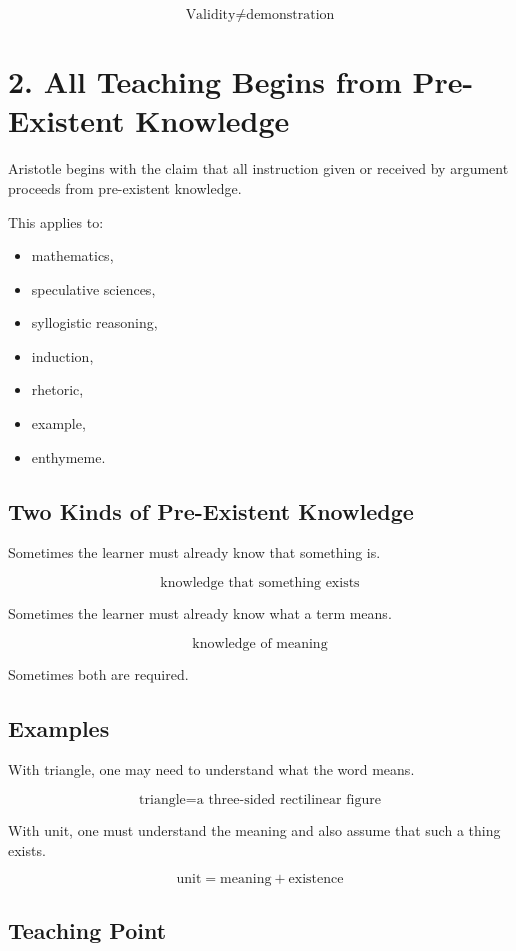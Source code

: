 \documentclass[12pt]{article}
\begin{document}
\[
\boxed{
\text{Validity} \neq \text{demonstration}
}
\]

\section*{2. All Teaching Begins from Pre-Existent Knowledge}

Aristotle begins with the claim that all instruction given or received by
argument proceeds from pre-existent knowledge.

This applies to:

\begin{itemize}[itemsep=0.25em]
    \item mathematics,
    \item speculative sciences,
    \item syllogistic reasoning,
    \item induction,
    \item rhetoric,
    \item example,
    \item enthymeme.
\end{itemize}

\subsection*{Two Kinds of Pre-Existent Knowledge}

Sometimes the learner must already know that something is.

\[
\text{knowledge that something exists}
\]

Sometimes the learner must already know what a term means.

\[
\text{knowledge of meaning}
\]

Sometimes both are required.

\subsection*{Examples}

With triangle, one may need to understand what the word means.

\[
\text{triangle} = \text{a three-sided rectilinear figure}
\]

With unit, one must understand the meaning and also assume that such a thing
exists.

\[
\text{unit} = \text{meaning} + \text{existence}
\]

\subsection*{Teaching Point}
\end{document}
